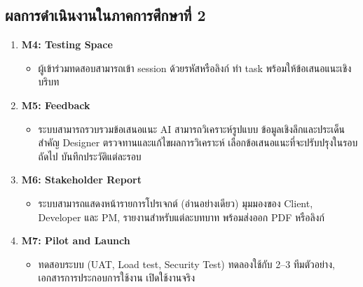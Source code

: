 \subsection{ผลการดำเนินงานในภาคการศึกษาที่ 2}
\begin{enumerate}
  \item \textbf{M4: Testing Space}
    \begin{itemize}
      \item ผู้เข้าร่วมทดสอบสามารถเข้า session ด้วยรหัสหรือลิงก์ ทำ task พร้อมให้ข้อเสนอแนะเชิงบริบท
    \end{itemize}
  \item \textbf{M5: Feedback}
    \begin{itemize}
      \item ระบบสามารถรวบรวมข้อเสนอแนะ AI สามารถวิเคราะห์รูปแบบ ข้อมูลเชิงลึกและประเด็นสำคัญ Designer ตรวจทานและแก้ไขผลการวิเคราะห์ เลือกข้อเสนอแนะที่จะปรับปรุงในรอบถัดไป บันทึกประวัติแต่ละรอบ
    \end{itemize}
  \item \textbf{M6: Stakeholder Report}
    \begin{itemize}
      \item ระบบสามารถแสดงหน้ารายการโปรเจกต์ (อ่านอย่างเดียว) มุมมองของ Client, Developer และ PM, รายงานสำหรับแต่ละบทบาท พร้อมส่งออก PDF หรือลิงก์
    \end{itemize}
  \item \textbf{M7: Pilot and Launch}
    \begin{itemize}
      \item ทดสอบระบบ (UAT, Load test, Security Test) ทดลองใช้กับ 2–3 ทีมตัวอย่าง, เอกสารการประกอบการใช้งาน เปิดใช้งานจริง
    \end{itemize}
\end{enumerate}

